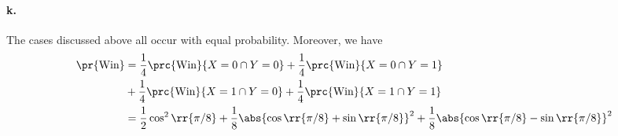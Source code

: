 \documentclass{article}
\begin{document}
\paragraph{k.}

The cases discussed above all occur with equal probability. Moreover, we have
\begin{align*}
  \pr{\text{Win}} &= \frac{1}{4}\prc{\text{Win}}{X=0\cap Y=0} +\frac{1}{4}\prc{\text{Win}}{X=0\cap Y=1}\\
                  &+\frac{1}{4}\prc{\text{Win}}{X=1\cap Y=0} +\frac{1}{4}\prc{\text{Win}}{X=1\cap Y=1}\\
                  &=\frac{1}{2}\cos^2\rr{\pi/8}+\frac{1}{8}\abs{\cos\rr{\pi/8}+\sin\rr{\pi/8}}^2+\frac{1}{8}\abs{\cos\rr{\pi/8}-\sin\rr{\pi/8}}^2
\end{align*}
\end{document}
